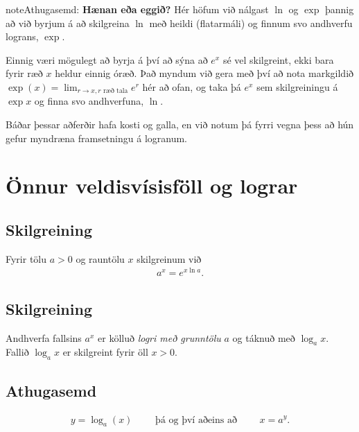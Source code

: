 \documentclass[b5paper,11pt,icelandic]{sphinxmanual}
\begin{document}
\begin{notice}{note}{Athugasemd:}
\textbf{Hænan eða eggið?} Hér höfum við nálgast \(\ln\) og \(\exp\)
þannig að við byrjum á að skilgreina \(\ln\) með heildi (flatarmáli)
og finnum svo andhverfu lograns, \(\exp\).

Einnig væri mögulegt að byrja á því að sýna að \(e^x\) sé vel
skilgreint, ekki bara fyrir ræð \(x\) heldur einnig óræð. Það myndum
við gera með því að nota markgildið
\(\exp(x)=\lim_{r\to x, r\text{ ræð tala}} e^r\)
hér að ofan, og taka þá \(e^x\) sem
skilgreiningu á \(\exp x\) og finna svo andhverfuna, \(\ln\).

Báðar þessar aðferðir hafa kosti og galla, en við notum þá fyrri vegna
þess að hún gefur myndræna framsetningu á logranum.
\end{notice}


\section{Önnur veldisvísisföll og lograr}
\label{kafli04:onnur-veldisvisisfoll-og-lograr}

\subsection{Skilgreining}
\label{kafli04:skilgreining}\label{kafli04:index-3}
Fyrir tölu \(a>0\) og rauntölu \(x\) skilgreinum við
\begin{equation*}
\begin{split}a^x=e^{x\ln a}.\end{split}
\end{equation*}

\subsection{Skilgreining}
\label{kafli04:id3}\label{kafli04:index-4}
Andhverfa fallsins \(a^x\) er kölluð \emph{logri með grunntölu} \(a\)
og táknuð með \(\log_a x\). Fallið \(\log_a x\) er skilgreint
fyrir öll \(x>0\).


\subsection{Athugasemd}
\label{kafli04:athugasemd}\begin{equation*}
\begin{split}y =\log_a(x)\qquad \text{ þá og því aðeins að } \qquad x = a^y.\end{split}
\end{equation*}
\end{document}
